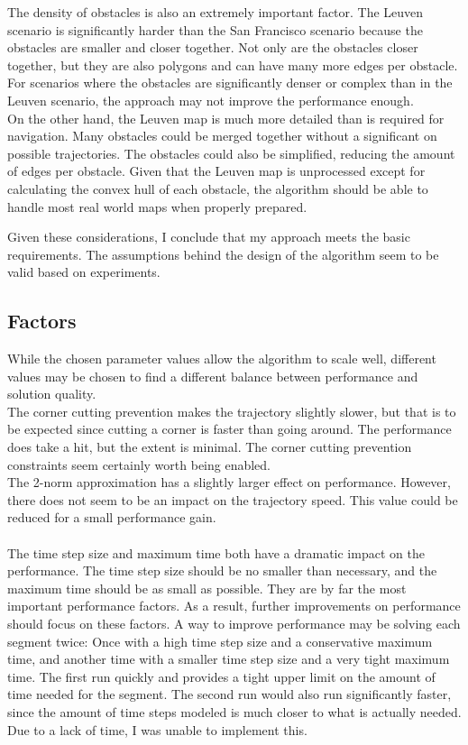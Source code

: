 The density of obstacles is also an extremely important factor. The Leuven scenario is significantly harder than the San Francisco scenario because the obstacles are smaller and closer together. Not only are the obstacles closer together, but they are also polygons and can have many more edges per obstacle. For scenarios where the obstacles are significantly denser or complex than in the Leuven scenario, the approach may not improve the performance enough. \\
On the other hand, the Leuven map is much more detailed than is required for navigation. Many obstacles could be merged together without a significant on possible trajectories. The obstacles could also be simplified, reducing the amount of edges per obstacle. Given that the Leuven map is unprocessed except for calculating the convex hull of each obstacle, the algorithm should be able to handle most real world maps when properly prepared.

Given these considerations, I conclude that my approach meets the basic requirements. The assumptions behind the design of the algorithm seem to be valid based on experiments.

\subsection{Factors}
While the chosen parameter values allow the algorithm to scale well, different values may be chosen to find a different balance between performance and solution quality. \\
The corner cutting prevention makes the trajectory slightly slower, but that is to be expected since cutting a corner is faster than going around. The performance does take a hit, but the extent is minimal. The corner cutting prevention constraints seem certainly worth being enabled. \\
The 2-norm approximation has a slightly larger effect on performance. However, there does not seem to be an impact on the trajectory speed. This value could be reduced for a small performance gain. \\ \\

The time step size and maximum time both have a dramatic impact on the performance. The time step size should be no smaller than necessary, and the maximum time should be as small as possible. They are by far the most important performance factors. As a result, further improvements on performance should focus on these factors. A way to improve performance may be solving each segment twice: Once with a high time step size and a conservative maximum time, and another time with a smaller time step size and a very tight maximum time. The first run quickly and provides a tight upper limit on the amount of time needed for the segment. The second run would also run significantly faster, since the amount of time steps modeled is much closer to what is actually needed. Due to a lack of time, I was unable to implement this. \\

